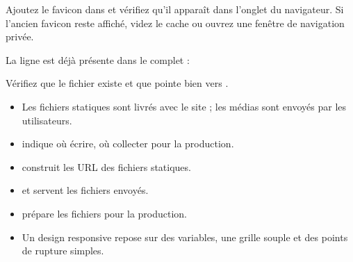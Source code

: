 \begin{exercice}[ : favicon]
Ajoutez le favicon dans  et vérifiez qu'il apparaît dans l'onglet
du navigateur. Si l'ancien favicon reste affiché, videz le cache ou ouvrez une
fenêtre de navigation privée.
\end{exercice}

\begin{correction}
La ligne est déjà présente dans le  complet :


Vérifiez que le fichier  existe et que
 pointe bien vers .
\end{correction}

\begin{retenir}
\begin{itemize}
  \item Les fichiers statiques sont livrés avec le site ; les médias sont envoyés
        par les utilisateurs.
  \item {} indique où écrire,  où
        collecter pour la production.
  \item {} construit les URL des fichiers statiques.
  \item {} et  servent les fichiers envoyés.
  \item {} prépare les fichiers pour la production.
  \item Un design responsive repose sur des variables, une grille souple et des
        points de rupture simples.
\end{itemize}
\end{retenir}
